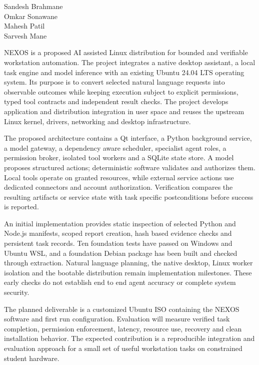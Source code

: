 \vspace{15mm}
\begin{flushright}
Sandesh Brahmane\\Omkar Sonawane\\Mahesh Patil\\Sarvesh Mane
\end{flushright}
\clearpage
{}
NEXOS is a proposed AI assisted Linux distribution for bounded and verifiable workstation automation. The project integrates a native desktop assistant, a local task engine and model inference with an existing Ubuntu 24.04 LTS operating system. Its purpose is to convert selected natural language requests into observable outcomes while keeping execution subject to explicit permissions, typed tool contracts and independent result checks. The project develops application and distribution integration in user space and reuses the upstream Linux kernel, drivers, networking and desktop infrastructure.

The proposed architecture contains a Qt interface, a Python background service, a model gateway, a dependency aware scheduler, specialist agent roles, a permission broker, isolated tool workers and a SQLite state store. A model proposes structured actions; deterministic software validates and authorizes them. Local tools operate on granted resources, while external service actions use dedicated connectors and account authorization. Verification compares the resulting artifacts or service state with task specific postconditions before success is reported.

An initial implementation provides static inspection of selected Python and Node.js manifests, scoped report creation, hash based evidence checks and persistent task records. Ten foundation tests have passed on Windows and Ubuntu WSL, and a foundation Debian package has been built and checked through extraction. Natural language planning, the native desktop, Linux worker isolation and the bootable distribution remain implementation milestones. These early checks do not establish end to end agent accuracy or complete system security.

The planned deliverable is a customized Ubuntu ISO containing the NEXOS software and first run configuration. Evaluation will measure verified task completion, permission enforcement, latency, resource use, recovery and clean installation behavior. The expected contribution is a reproducible integration and evaluation approach for a small set of useful workstation tasks on constrained student hardware.

